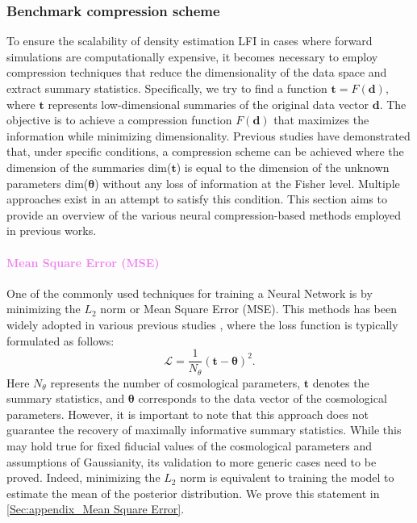 \documentclass{aa}
\begin{document}
\subsubsection{Benchmark compression scheme}
To ensure the scalability of density estimation LFI in cases where forward simulations are computationally expensive, it becomes necessary to employ compression techniques that reduce the dimensionality of the data space and extract summary statistics. 
Specifically, we try to find a function $\bm{t}=F(\bm{d})$, where $\bm{t}$ represents low-dimensional summaries of the original data vector $\bm{d}$. The objective is to achieve a compression function $F(\bm{d})$ that maximizes the information while minimizing dimensionality. Previous studies \citep{alsing2018generalized} have demonstrated that, under specific conditions, a compression scheme can be achieved where the dimension of the summaries dim($\bm{t}$) is equal to the dimension of the unknown parameters dim($\bm{\theta}$) without any loss of information at the Fisher level. Multiple approaches exist in an attempt to satisfy this condition. This section aims to provide an overview of the various neural compression-based methods employed in previous works.
\paragraph{\textcolor{violet}{Mean Square Error (MSE)}}
One of the commonly used techniques for training a Neural Network is by minimizing the $L_2$ norm or Mean Square Error (MSE).
This methods has been widely adopted in various previous studies  \citep{ribli2018improved, lu2022simultaneously, lu2023cosmological}, where the loss function is typically formulated as follows:
\begin{equation}
   \mathcal{L}=\frac{1}{N_{\theta}}(\bm{t}-\bm{\theta})^2.
\end{equation}
Here $N_{\theta}$ represents the number of cosmological parameters, $\bm{t}$ denotes the summary statistics, and $\bm{\theta}$ corresponds to the data vector of the cosmological parameters. 
However, it is important to note that this approach does not guarantee the recovery of maximally informative summary statistics. While this may hold true for fixed fiducial values of the cosmological parameters and assumptions of Gaussianity, its validation to more generic cases need to be proved. Indeed, minimizing the $L_{2}$ norm is equivalent to training the model to estimate the mean of the posterior distribution. We prove this statement in \autoref{Sec:appendix_Mean Square Error}.
\end{document}

